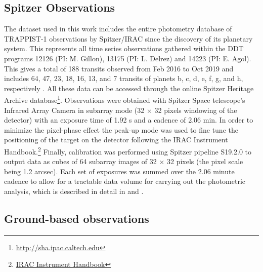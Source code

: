 \documentclass[twocolumn]{aastex63}
\begin{document}

\subsection{Spitzer Observations} \label{sec:spitzerobs}

The dataset used in this work includes the entire photometry database of TRAPPIST-1 observations by Spitzer/IRAC since the discovery of its planetary system. This represents all time series observations gathered within the DDT programs 12126 (PI: M. Gillon), 13175 (PI: L. Delrez) and 14223 (PI: E. Agol). This gives a total of 188 transits observed from Feb 2016 to Oct 2019 and includes 64, 47, 23, 18, 16, 13, and 7 transits of planets b, c, d, e, f, g, and h, respectively \citep{Ducrot2020}. All these data can be accessed through the online Spitzer Heritage Archive database\footnote{\url{http://sha.ipac.caltech.edu}}.
Observations were obtained with Spitzer Space telescope's Infrared Array Camera \citep[IRAC;][] {Carey2004} in subarray mode (32 $\times$ 32 pixels windowing of the detector) with an exposure time of 1.92 s and a cadence of 2.06 min. In order to minimize the pixel-phase effect \citep{Knutson2008} the peak-up mode was used \citep{Ingalls2016} to fine tune the positioning of the target on the detector following the IRAC Instrument Handbook.\footnote{\href{https://irsa.ipac.caltech.edu/data/SPITZER/docs/irac/iracinstrumenthandbook/}{IRAC Instrument Handbook}} Finally, calibration was performed using Spitzer pipeline S19.2.0 to output data as cubes of 64 subarray images of 32 $\times$ 32 pixels (the pixel scale being 1.2 arcsec). Each set of exposures was summed over the 2.06 minute cadence to allow for a tractable data volume for carrying out the photometric analysis, which is described in detail in \citet{Delrez2018a} and \citet{Ducrot2020}.

\subsection{Ground-based observations} \label{sec:groundbasedobs}

\end{document}
